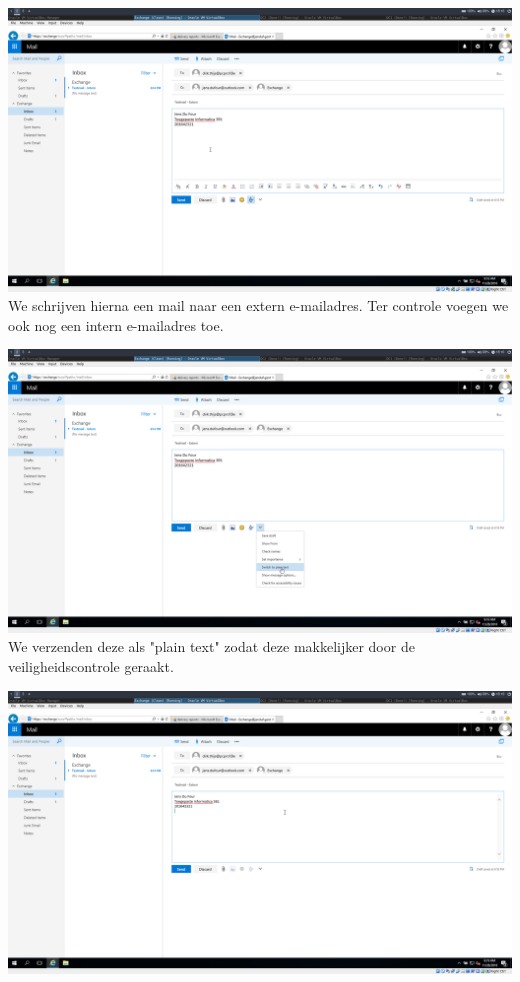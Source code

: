 \documentclass[a4paper]{article}
\begin{document}
\begin{center}
	\includegraphics[width=15cm]{Pictures/Exchange/test/1543425377.png}
	We schrijven hierna een mail naar een extern e-mailadres. Ter controle voegen we ook nog een intern e-mailadres toe.
\end{center}
\begin{center}
	\includegraphics[width=15cm]{Pictures/Exchange/test/1543425387.png}
	We verzenden deze als "plain text" zodat deze makkelijker door de veiligheidscontrole geraakt.
\end{center}
\begin{center}
	\includegraphics[width=15cm]{Pictures/Exchange/test/1543425598.png}
\end{center}
\end{document}
